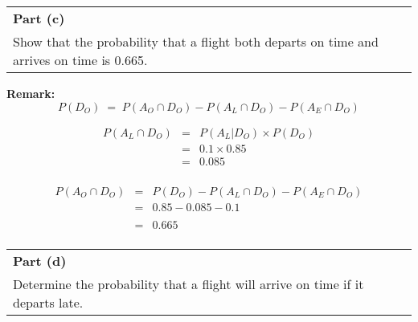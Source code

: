 \documentclass[a4paper,12pt]{article}
\begin{document}



\newpage


\begin{table}[ht!]
 \centering
 \begin{tabular}{|p{15cm}|}
 \hline  \large \smallskip
\noindent \textbf{Part (c)}\\  \large
 Show that the probability that a flight both departs on time and arrives on time
is 0.665.\smallskip
 \\  \hline
  \end{tabular}
\end{table}


\begin{framed}
\noindent \textbf{Remark:}
\[P(D_{O}) \;=\; P(A_{O} \cap D_{O}) - P(A_{L} \cap D_{O}) - P(A_{E} \cap D_{O})\]
\end{framed}



\begin{eqnarray*}
P(A_{L} \cap D_{O}) &=& P(A_{L}| D_{O}) \times P(D_{O}) \\ 
&=& 0.1 \times 0.85 \\
&=& 0.085 \\
\end{eqnarray*}


\begin{eqnarray*}
P(A_{O} \cap D_{O}) &=& P(D_{O}) - P(A_{L} \cap D_{O}) - P(A_{E} \cap D_{O})\\
&=& 0.85 - 0.085 - 0.1\\
& & \\
&=& 0.665\\
\end{eqnarray*} 



\newpage



\begin{table}[ht!]
 \centering
 \begin{tabular}{|p{15cm}|}
 \hline  \large \smallskip
\noindent \textbf{Part (d)} \\ \large \smallskip  
Determine the probability that a flight will arrive on time if it departs late. \smallskip
 \\  \hline
  \end{tabular}
\end{table}
\end{document}
